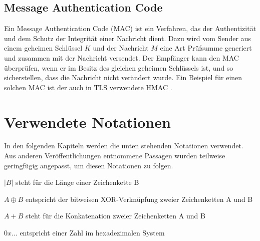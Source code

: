 \subsection{Message Authentication Code}

\label{sec_mac}

Ein Message Authentication Code (MAC) ist ein Verfahren, das der Authentizität und dem Schutz der Integrität einer Nachricht dient. Dazu wird vom Sender aus einem geheimen Schlüssel \(K\) und der Nachricht \(M\) eine Art Prüfsumme generiert und zusammen mit der Nachricht versendet. Der Empfänger kann den MAC überprüfen, wenn er im Besitz des gleichen geheimen Schlüssels ist, und so sicherstellen, dass die Nachricht nicht verändert wurde. Ein Beispiel für einen solchen MAC ist der auch in TLS verwendete HMAC \cite{Schneier2006, ferguson10}.

\section{Verwendete Notationen}

In den folgenden Kapiteln werden die unten stehenden Notationen verwendet. Aus anderen Veröffentlichungen entnommene Passagen wurden teilweise geringfügig angepasst, um diesen Notationen zu folgen.

\(|B|\) steht für die Länge einer Zeichenkette B

\(A \oplus B\) entspricht der bitweisen XOR-Verknüpfung zweier Zeichenketten A und B

\(A + B\) steht für die Konkatenation zweier Zeichenketten A und B

\(0x\dots\) entspricht einer Zahl im hexadezimalen System

